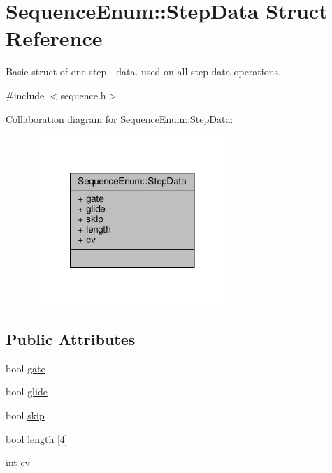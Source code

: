 \hypertarget{structSequenceEnum_1_1StepData}{\section{Sequence\-Enum\-:\-:Step\-Data Struct Reference}
\label{structSequenceEnum_1_1StepData}
}


Basic struct of one step -\/ data. used on all step data operations.  




{\ttfamily \#include $<$sequence.\-h$>$}



Collaboration diagram for Sequence\-Enum\-:\-:Step\-Data\-:\nopagebreak
\begin{figure}[H]
\begin{center}
\leavevmode
\includegraphics[width=212pt]{structSequenceEnum_1_1StepData__coll__graph}
\end{center}
\end{figure}
\subsection*{Public Attributes}
\begin{DoxyCompactItemize}
\item 
bool \hyperlink{structSequenceEnum_1_1StepData_a597603a9b2d9eaf490f659dfcbbee804}{gate}
\item 
bool \hyperlink{structSequenceEnum_1_1StepData_a067c43b25989443622354b94ddee2799}{glide}
\item 
bool \hyperlink{structSequenceEnum_1_1StepData_ac3146c1d3252ee1326959fa3b8191490}{skip}
\item 
bool \hyperlink{structSequenceEnum_1_1StepData_a493978b8534c96c86e10b51be7f4bf62}{length} \mbox{[}4\mbox{]}
\item 
int \hyperlink{structSequenceEnum_1_1StepData_a94070c904112e9bbc18ac7e63ea1d8d0}{cv}
\end{DoxyCompactItemize}


